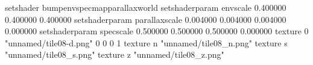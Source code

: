 setshader bumpenvspecmapparallaxworld
setshaderparam envscale 0.400000 0.400000 0.400000
setshaderparam parallaxscale 0.004000 0.004000 0.004000 0.000000
setshaderparam specscale 0.500000 0.500000 0.500000 0.000000
texture 0 "unnamed/tile08-d.png" 0 0 0 1
texture n "unnamed/tile08_n.png"
texture s "unnamed/tile08_s.png"
texture z "unnamed/tile08_z.png"